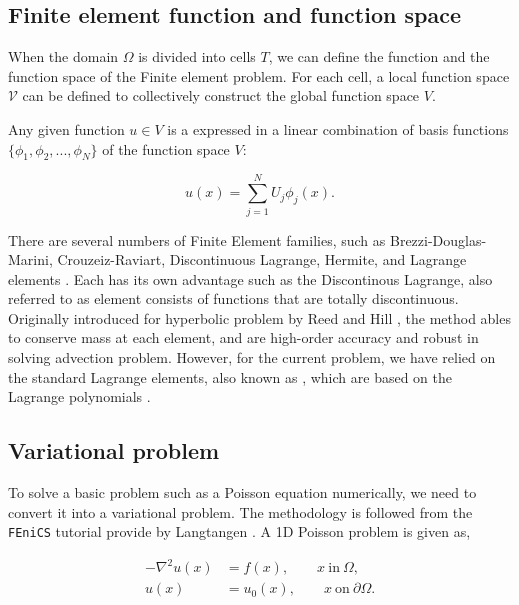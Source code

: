\subsection*{Finite element function and function space}

When the domain $\Omega$ is divided into cells $T$, we can define the function and the function space of the Finite element problem. For each cell, a local function space $\mathcal{V}$ can be defined to collectively construct the global function space $V$.

Any given function $u \in V$ is a expressed in a linear combination of basis functions $\{\phi_1,\phi_2,...,\phi_N\}$  of the function space $V$:

	\begin{equation}
	u(x) = \sum_{j=1}^N U_j\phi_j(x).
	\end{equation}

There are several numbers of Finite Element families, such as Brezzi-Douglas-Marini, Crouzeiz-Raviart, Discontinuous Lagrange, Hermite, and Lagrange elements \cite{Logg2012a}. Each has its own advantage such as the Discontinous Lagrange, also referred to as  element consists of functions that are totally discontinuous. Originally introduced for hyperbolic problem by Reed and Hill \cite{Reed1973}, the method ables to conserve mass at each element, and are high-order accuracy and robust in solving advection problem. However, for the current problem, we have relied on the standard Lagrange elements, also known as , which are based on the Lagrange polynomials \cite{Chen2011}.

\subsection*{Variational problem}
\label{subsec:variationalProblem}

To solve a basic problem such as a Poisson equation numerically, we need to convert it into a variational problem. The methodology is followed from the \texttt{FEniCS} tutorial provide by Langtangen \cite{Langtangen2012}. A 1D Poisson problem is given as,

	\begin{subequations}
	\begin{align*}
	- \nabla^2 u(x) &= f(x), \qquad x\ \mathrm{in}\ \Omega,\\
	u(x) &= u_0(x), \qquad x\ \mathrm{on}\ \partial\Omega.
	\end{align*}
	\label{eq:poissonEq}
	\end{subequations}
	
